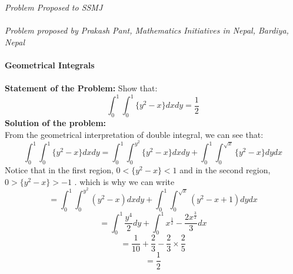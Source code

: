 \documentclass[12pt]{article}
\begin{document}
\textit{Problem Proposed to SSMJ }\\ \\
\textit{Problem proposed by Prakash Pant, Mathematics Initiatives in Nepal, Bardiya, Nepal}\\ \\
\textbf{ Geometrical Integrals} \\ \\
\textbf{Statement of the Problem:}
Show that:
\[ \int_0^1 \int_0^1 \{ y^2-x\} dx dy = \frac{1}{2}\]
\textbf{ Solution of the problem: } \\ 
From the geometrical interpretation of double integral, we can see that: \\
\[ \int_0^1 \int_0^1 \{y^2-x\} dx dy = \int_0^1 \int_0^{y^2} \{y^2-x\} dx dy + \int_0^1 \int_0^{\sqrt{x}} \{y^2-x\} dy dx \]
Notice that in the first region, $0 < \{y^2-x\}<1$ and in the second region, $0>\{ y^2-x \} >-1$ . which is why we can write \\
\[  = \int_0^1 \int_0^{y^2}(y^2-x) dx dy + \int_0^1 \int_0^{\sqrt{x}} (y^2-x+1) dy dx \] 
\[  = \int_0^1  \frac{y^4}{2} dy + \int_0^1  x^{\frac{1}{2}}- \frac{2x^{\frac{3}{2}}}{3}  dx \] 
\[ = \frac{1}{10} + \frac{2}{3} - \frac{2}{3} \times \frac{2}{5} \]
\[ = \frac{1}{2} \]
 



					
\end{document}
